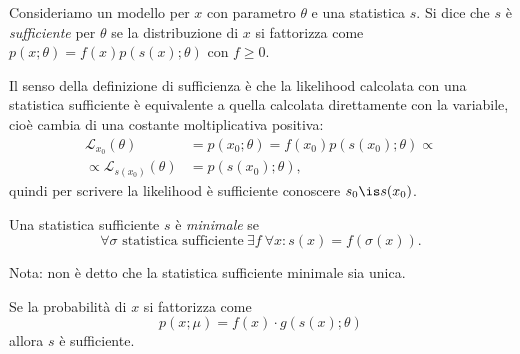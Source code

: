 
\begin{definition}[Sufficienza]
	\label{th:suff}
	Consideriamo un modello per $x$ con parametro $\theta$ e una statistica $s$.
	Si dice che $s$ è \emph{sufficiente} per $\theta$ se la distribuzione di $x$ si fattorizza come
	$p(x;\theta) = f(x) p(s(x);\theta)$ con $f\ge0$.
\end{definition}

Il senso della definizione di sufficienza
è che la likelihood calcolata con una statistica sufficiente
è equivalente a quella calcolata direttamente con la variabile,
cioè cambia di una costante moltiplicativa positiva:
\begin{align*}
	\mathcal L_{x_0}(\theta)
	&= p(x_0;\theta) = f(x_0) p(s(x_0);\theta) \propto \\
	\propto \mathcal L_{s(x_0)}(\theta)
	&= p(s(x_0);\theta),
\end{align*}
quindi per scrivere la likelihood è sufficiente conoscere $s_0 \is s(x_0)$.


\begin{definition}
	Una statistica sufficiente $s$ è \emph{minimale} se
	\begin{equation*}
		\forall \sigma \text{ statistica sufficiente}\ \exists f\ \forall x:
		s(x) = f(\sigma(x)).
	\end{equation*}
\end{definition}
\noindent Nota: non è detto che la statistica sufficiente minimale sia unica.

\begin{theorem}
	\label{th:suffatt}
	Se la probabilità di $x$ si fattorizza come
	\begin{equation*}
		p(x;\mu) = f(x)\cdot g(s(x);\theta)
	\end{equation*}
	allora $s$ è sufficiente.
\end{theorem}

